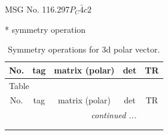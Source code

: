 \documentclass[fleqn,8pt]{jsarticle}
\begin{document}
\setcounter{MaxMatrixCols}{32}

\renewcommand{\tablename}{Table~}
\renewcommand{\figurename}{Figure~}
\begin{center}
\LARGE
MSG No. 116.297\quad$P_{C}\bar{4}c2$
\end{center}
* symmetry operation
\renewcommand{\arraystretch}{1.3}
\begin{longtable}{ccccc}
\caption{Symmetry operations for 3d polar vector.}
 \\
 \hline \hline
No. & tag & matrix (polar) & det & TR \\ \hline \endfirsthead

\multicolumn{4}{l}{\tablename\ \thetable{}} \\
 \hline \hline
No. & tag & matrix (polar) & det & TR \\ \hline \endhead

 \hline \hline
\multicolumn{4}{r}{\footnotesize\it continued ...} \\ \endfoot

 \hline \hline
\multicolumn{4}{r}{} \\ \endlastfoot


\end{longtable}
\end{document}
